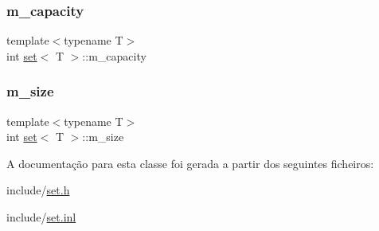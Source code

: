 \mbox{\label{classset_a2ae225941f817ad23f0e4871c618ce99}} 
\subsubsection{\texorpdfstring{m\+\_\+capacity}{m\_capacity}}
{\footnotesize\ttfamily template$<$typename T$>$ \\
int \hyperlink{classset}{set}$<$ T $>$\+::m\+\_\+capacity\hspace{0.3cm}{\ttfamily [private]}}

\mbox{\label{classset_a812642c970155b2365cee6997e3f7126}} 
\subsubsection{\texorpdfstring{m\+\_\+size}{m\_size}}
{\footnotesize\ttfamily template$<$typename T$>$ \\
int \hyperlink{classset}{set}$<$ T $>$\+::m\+\_\+size\hspace{0.3cm}{\ttfamily [private]}}



A documentação para esta classe foi gerada a partir dos seguintes ficheiros\+:\begin{DoxyCompactItemize}
\item 
include/\hyperlink{set_8h}{set.\+h}\item 
include/\hyperlink{set_8inl}{set.\+inl}\end{DoxyCompactItemize}
